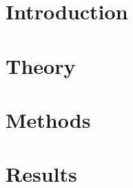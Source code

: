 \documentclass[]{article}
\begin{document}




    

    \tableofcontents

    \newpage

    \listoffigures
    \listoftables
    
    \cleardoublepage


    

    \section{Introduction}

    

    \section{Theory}

    

    \section{Methods}

    
    
    \section{Results}

    

    \newpage

    
    

    \newpage

    
\end{document}
